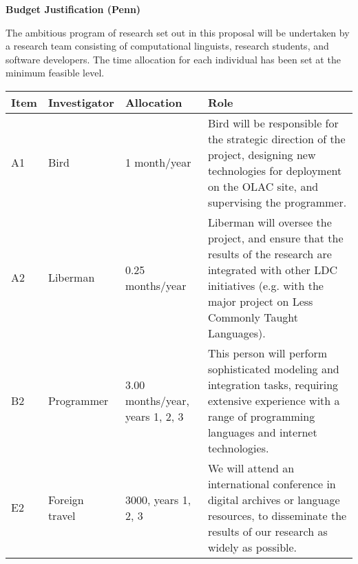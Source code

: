 \documentclass[11pt]{nsf}
\begin{document}
\begin{center}\textbf{\Large
Budget Justification (Penn)
}\end{center}

The ambitious program of research set out in this proposal will be
undertaken by a research team consisting of computational linguists,
research students, and software developers.  The time allocation for
each individual has been set at the minimum feasible level.

\vspace{1ex}

{\small\noindent
\begin{tabular}{lllp{3in}}
\textbf{Item} &
\textbf{Investigator} & \textbf{Allocation} & \textbf{Role} \\ \hline

A1 & Bird & 1 month/year &
Bird will be responsible for the strategic direction of the project,
designing new technologies for deployment on the OLAC site,
and supervising the programmer. \\

A2 & Liberman & 0.25 months/year &
Liberman will oversee the project, and ensure that the results of the
research are integrated with other LDC initiatives (e.g. with the
major project on Less Commonly Taught Languages).\\

B2 & Programmer & 3.00 months/year, years 1, 2, 3 &
This person will perform sophisticated modeling and integration tasks,
requiring extensive experience with a range of programming languages
and internet technologies. \\

E2 & Foreign travel & 3000, years 1, 2, 3 &
We will attend an international conference in digital archives or
language resources, to disseminate the results of our research as
widely as possible. \\

\end{tabular}}
\end{document}

